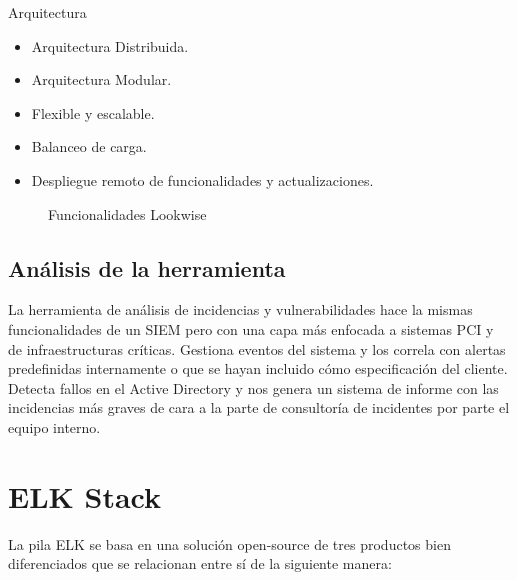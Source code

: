 Arquitectura
\begin{itemize}
\item Arquitectura Distribuida.
\item Arquitectura Modular.
\item Flexible y escalable.
\item Balanceo de carga.
\item Despliegue remoto de funcionalidades y actualizaciones.
\end{itemize}
\begin{figure}[H]
\caption{Funcionalidades Lookwise}
\end{figure}

\subsection{Análisis de la herramienta}

La herramienta de análisis de incidencias y vulnerabilidades hace la mismas funcionalidades de un SIEM pero con una capa más enfocada a sistemas PCI y de infraestructuras críticas. Gestiona eventos del sistema y los correla con alertas predefinidas internamente o que se hayan incluido cómo especificación del cliente. Detecta fallos en el Active Directory y nos genera un sistema de informe con las incidencias más graves de cara a la parte de consultoría de incidentes por parte el equipo interno.


\section{ELK Stack}

La pila ELK se basa en una solución open-source de tres productos bien diferenciados que se relacionan entre sí de la siguiente manera:

